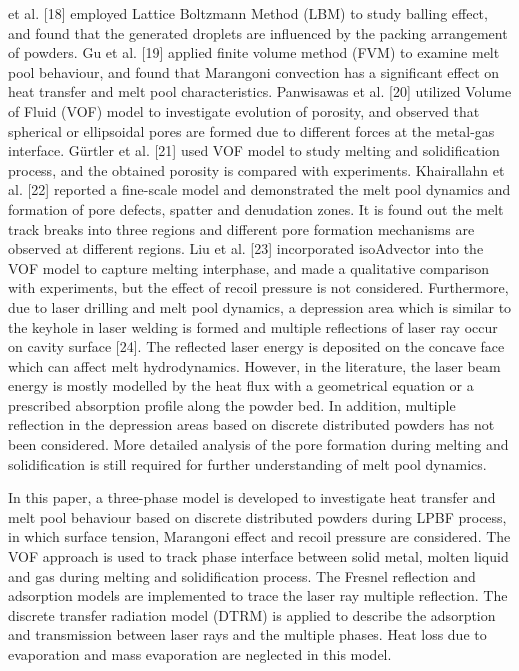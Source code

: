 \documentclass[10pt]{article}
\begin{document}
et al. [18] employed Lattice Boltzmann Method (LBM) to study balling effect, and found that the generated droplets are influenced by the packing arrangement of powders. Gu et al. [19] applied finite volume method (FVM) to examine melt pool behaviour, and found that Marangoni convection has a significant effect on heat transfer and melt pool characteristics. Panwisawas et al. [20] utilized Volume of Fluid (VOF) model to investigate evolution of porosity, and observed that spherical or ellipsoidal pores are formed due to different forces at the metal-gas interface. Gürtler et al. [21] used VOF model to study melting and solidification process, and the obtained porosity is compared with experiments. Khairallahn et al. [22] reported a fine-scale model and demonstrated the melt pool dynamics and formation of pore defects, spatter and denudation zones. It is found out the melt track breaks into three regions and different pore formation mechanisms are observed at different regions. Liu et al. [23] incorporated isoAdvector into the VOF model to capture melting interphase, and made a qualitative comparison with experiments, but the effect of recoil pressure is not considered. Furthermore, due to laser drilling and melt pool dynamics, a depression area which is similar to the keyhole in laser welding is formed and multiple reflections of laser ray occur on cavity surface [24]. The reflected laser energy is deposited on the concave face which can affect melt hydrodynamics. However, in the literature, the laser beam energy is mostly modelled by the heat flux with a geometrical equation or a prescribed absorption profile along the powder bed. In addition, multiple reflection in the depression areas based on discrete distributed powders has not been considered. More detailed analysis of the pore formation during melting and solidification is still required for further understanding of melt pool dynamics.

In this paper, a three-phase model is developed to investigate heat transfer and melt pool behaviour based on discrete distributed powders during LPBF process, in which surface tension, Marangoni effect and recoil pressure are considered. The VOF approach is used to track phase interface between solid metal, molten liquid and gas during melting and solidification process. The Fresnel reflection and adsorption models are implemented to trace the laser ray multiple reflection. The discrete transfer radiation model (DTRM) is applied to describe the adsorption and transmission between laser rays and the multiple phases. Heat loss due to evaporation and mass evaporation are neglected in this model.
\end{document}
